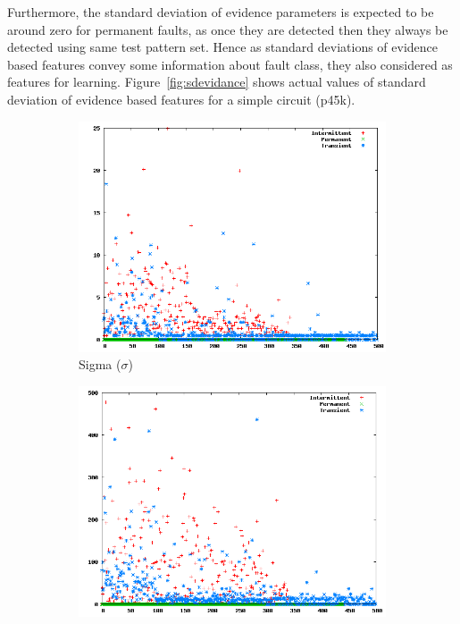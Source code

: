 Furthermore, the standard deviation of evidence parameters is expected to be around zero for permanent faults, as once they are detected then they always be detected using same test pattern set. Hence as standard deviations of evidence based features convey some information about fault class, they also considered as features for learning. Figure~\ref{fig:sdevidance} shows actual values of standard deviation of evidence based features for a simple circuit (p45k).

\begin{figure}
        \centering
			\captionsetup{justification=centering}
        \begin{subfigure}[h]{0.45\linewidth}
                \includegraphics[scale=0.32]{figures/sdsigmap45k.png}
                \caption{Sigma ($\sigma$)}
        \end{subfigure}
        \begin{subfigure}[h]{0.45\linewidth}
                \includegraphics[scale=0.32]{figures/sdiotap45k.png}

\end{subfigure}
\end{figure}
